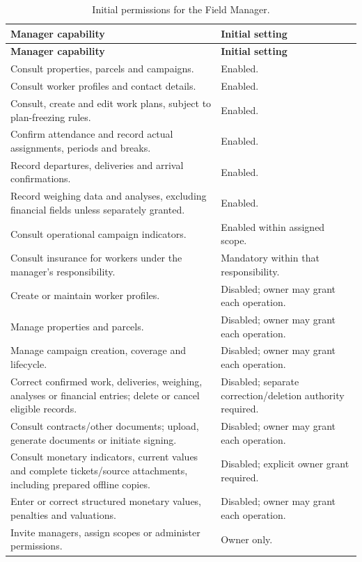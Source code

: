 {\compacttable
\begin{longtable}{L{0.65}L{0.35}}
\caption{Initial permissions for the Field Manager.}\label{tab:manager-permissions}\\
\toprule{}
\textbf{Manager capability} & \textbf{Initial setting}\\
\midrule\endfirsthead
\toprule{}
\textbf{Manager capability} & \textbf{Initial setting}\\
\midrule\endhead
\bottomrule\endfoot
Consult properties, parcels and campaigns. & Enabled.\\\midrule
Consult worker profiles and contact details. & Enabled.\\\midrule
Consult, create and edit work plans, subject to plan-freezing rules. & Enabled.\\\midrule
Confirm attendance and record actual assignments, periods and breaks. & Enabled.\\\midrule
Record departures, deliveries and arrival confirmations. & Enabled.\\\midrule
Record weighing data and analyses, excluding financial fields unless separately granted. & Enabled.\\\midrule
Consult operational campaign indicators. & Enabled within assigned scope.\\\midrule
Consult insurance for workers under the manager's responsibility. & Mandatory within that responsibility.\\\midrule
Create or maintain worker profiles. & Disabled; owner may grant each operation.\\\midrule
Manage properties and parcels. & Disabled; owner may grant each operation.\\\midrule
Manage campaign creation, coverage and lifecycle. & Disabled; owner may grant each operation.\\\midrule
Correct confirmed work, deliveries, weighing, analyses or financial entries; delete or cancel eligible records. & Disabled; separate correction/deletion authority required.\\\midrule
Consult contracts/other documents; upload, generate documents or initiate signing. & Disabled; owner may grant each operation.\\\midrule
Consult monetary indicators, current values and complete tickets/source attachments, including prepared offline copies. & Disabled; explicit owner grant required.\\\midrule
Enter or correct structured monetary values, penalties and valuations. & Disabled; owner may grant each operation.\\\midrule
Invite managers, assign scopes or administer permissions. & Owner only.\\
\end{longtable}}


